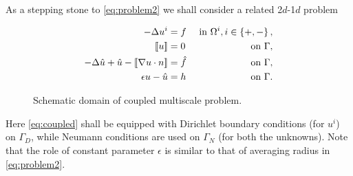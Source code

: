 \documentclass[r]{siamart171218}
\begin{document}
As a stepping stone to \eqref{eq:problem2} we shall consider a related
2$d$-1$d$ problem\\
\begin{minipage}{0.57\textwidth}
  \begin{equation}\label{eq:coupled}
    \begin{aligned}
      -\Delta u^i &= f &\mbox{ in }\Omega^{i}, i\in\left\{+, -\right\},\\
      \jump{u} &= 0 &\mbox{ on }\Gamma,\\
      -\Delta \hat{u} +\hat{u} - \jump{\nabla u\cdot n}&= \hat{f} &\mbox{ on }\Gamma,\\
      \epsilon u - \hat{u} &= h&\mbox{ on }\Gamma.\\
    \end{aligned}
\end{equation}
\null
\par\xdef\tpd{\the\prevdepth}
\end{minipage}
\hfill
\begin{minipage}{0.37\textwidth}
  \begin{figure}[H]
    \begin{center}
    \end{center}
    \caption{Schematic domain of coupled multiscale problem.}
    \label{fig:coupled_domain}
\end{figure}
\end{minipage}
%
Here \eqref{eq:coupled} shall be equipped with Dirichlet boundary conditions
(for $u^i$) on $\Gamma_D$, while Neumann conditions are used on $\Gamma_N$
(for both the unknowns). Note that the role of constant parameter $\epsilon$ is similar
to that of averaging radius in \eqref{eq:problem2}.
\end{document}
